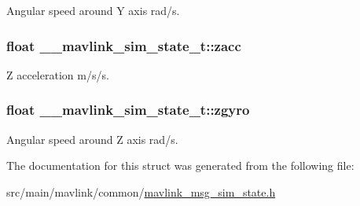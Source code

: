 Angular speed around Y axis rad/s. 

\hypertarget{struct____mavlink__sim__state__t_a9205c7cddd37f729f68695bcbec647f9}{
\subsubsection[{zacc}]{\setlength{\rightskip}{0pt plus 5cm}float \+\_\+\+\_\+mavlink\+\_\+sim\+\_\+state\+\_\+t\+::zacc}}\label{struct____mavlink__sim__state__t_a9205c7cddd37f729f68695bcbec647f9}


Z acceleration m/s/s. 

\hypertarget{struct____mavlink__sim__state__t_acb539dc5d540d5f101f254ffdcc56726}{
\subsubsection[{zgyro}]{\setlength{\rightskip}{0pt plus 5cm}float \+\_\+\+\_\+mavlink\+\_\+sim\+\_\+state\+\_\+t\+::zgyro}}\label{struct____mavlink__sim__state__t_acb539dc5d540d5f101f254ffdcc56726}


Angular speed around Z axis rad/s. 



The documentation for this struct was generated from the following file\+:\begin{DoxyCompactItemize}
\item 
src/main/mavlink/common/\hyperlink{mavlink__msg__sim__state_8h}{mavlink\+\_\+msg\+\_\+sim\+\_\+state.\+h}\end{DoxyCompactItemize}
